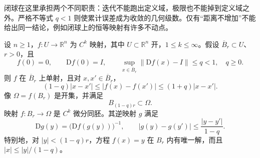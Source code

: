 闭球在这里承担两个不同职责：迭代不能跑出定义域，极限也不能掉到定义域之外。严格不等式 \(q<1\) 则使累计误差成为收敛的几何级数。仅有“距离不增加”不能给出同一结论，例如闭球上的恒等映射有许多不动点。

\begin{theorem}
	\label{g1:thm:quantitative-inverse-function}
	设 \(n\geq1\)，\(f:U\to\mathbb R^n\) 为 \(C^k\) 映射，其中 \(U\subset\mathbb R^n\) 开，\(1\leq k\leq\infty\)。假设 \(\overline B_r\subset U\)、\(r>0\)，且
	\[
		f(0)=0,\qquad \mathrm{D}f(0)=I,\qquad
		\sup_{x\in\overline B_r}\|\mathrm{D}f(x)-I\|\leq q<1,\quad q\geq0.
	\]
	则 \(f\) 在 \(\overline B_r\) 上单射，且对 \(x,x'\in\overline B_r\)，
	\begin{equation}
		\label{g1:eq:quantitative-inverse-bounds}
		(1-q)|x-x'|\leq|f(x)-f(x')|\leq(1+q)|x-x'|.
	\end{equation}
	像 \(\Omega=f(B_r)\) 是开集，并满足
	\[
		B_{(1-q)r}\subset\Omega.
	\]
	映射 \(f:B_r\to\Omega\) 是 \(C^k\) 微分同胚。其逆映射 \(g\) 满足
	\begin{equation}
		\label{g1:eq:inverse-derivative}
		\mathrm{D}g(y)=\bigl(\mathrm{D}f(g(y))\bigr)^{-1},\qquad
		|g(y)-g(y')|\leq\frac{|y-y'|}{1-q}.
	\end{equation}
	特别地，对 \(|y|<(1-q)r\)，方程 \(f(x)=y\) 在 \(B_r\) 内有唯一解，而且 \(|x|\leq|y|/(1-q)\)。
\end{theorem}

